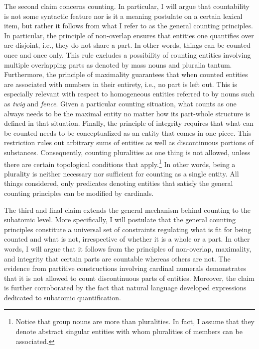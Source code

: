 The second claim concerns counting. In particular, I will argue that countability is not some syntactic feature nor is it a meaning postulate on a certain lexical item, but rather it follows from what I refer to as the general counting principles. In particular, the principle of non-overlap ensures that entities one quantifies over are disjoint, i.e., they do not share a part. In other words, things can be counted once and once only. This rule excludes a possibility of counting entities involving multiple overlapping parts as denoted by mass nouns and pluralia tantum. Furthermore, the principle of maximality guarantees that when counted entities are associated with numbers in their entirety, i.e., no part is left out. This is especially relevant with respect to homogeneous entities referred to by nouns such as \textit{twig} and \textit{fence}. Given a particular counting situation, what counts as one always needs to be the maximal entity no matter how its part-whole structure is defined in that situation. Finally, the principle of integrity requires that what can be counted needs to be conceptualized as an entity that comes in one piece. This restriction rules out arbitrary sums of entities as well as discontinuous portions of substances. Consequently, counting pluralities as one thing is not allowed, unless there are certain topological conditions that apply.\footnote{Notice that group nouns are more than pluralities. In fact, I assume that they denote abstract singular entities with whom pluralities of members can be associated.} In other words, being a plurality is neither necessary nor sufficient for counting as a single entity. All things considered, only predicates denoting entities that satisfy the general counting principles can be modified by cardinals.

The third and final claim extends the general mechanism behind counting to the subatomic level. More specifically, I will postulate that the general counting principles constitute a universal set of constraints regulating what is fit for being counted and what is not, irrespective of whether it is a whole or a part. In other words, I will argue that it follows from the principles of non-overlap, maximality, and integrity that certain parts are countable whereas others are not. The evidence from partitive constructions involving cardinal numerals demonstrates that it is not allowed to count discontinuous parts of entities. Moreover, the claim is further corroborated by the fact that natural language developed expressions dedicated to subatomic quantification.

